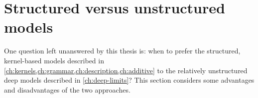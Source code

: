 





\section{Structured versus unstructured models}

One question left unanswered by this thesis is: when to prefer the structured, kernel-based models described in \cref{ch:kernels,ch:grammar,ch:description,ch:additive} to the relatively unstructured deep \gp{} models described in \cref{ch:deep-limits}?
This section considers some advantages and disadvantages of the two approaches.

